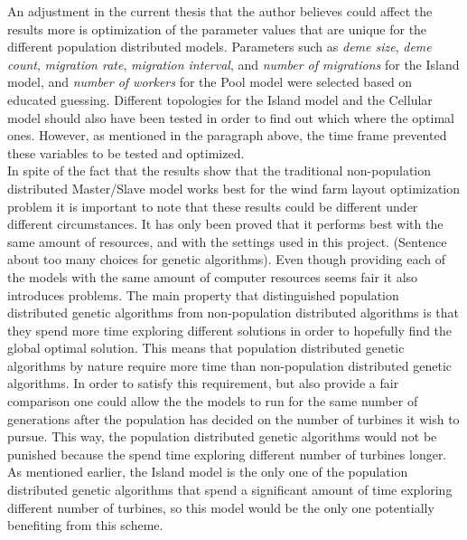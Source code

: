 \noindent An adjustment in the current thesis that the author believes could affect the results more is optimization of the parameter values that are unique for the different population distributed models. Parameters such as \textit{deme size}, \textit{deme count}, \textit{migration rate}, \textit{migration interval}, and \textit{number of migrations} for the Island model, and \textit{number of workers} for the Pool model were selected based on educated guessing. Different topologies for the Island model and the Cellular model should also have been tested in order to find out which where the optimal ones. However, as mentioned in the paragraph above, the time frame prevented these variables to be tested and optimized. \\

\noindent In spite of the fact that the results show that the traditional non-population distributed Master/Slave model works best for the wind farm layout optimization problem it is important to note that these results could be different under different circumstances. It has only been proved that it performs best with the same amount of resources, and with the settings used in this project. (Sentence about too many choices for genetic algorithms). Even though providing each of the models with the same amount of computer resources seems fair it also introduces problems. The main property that distinguished population distributed genetic algorithms from non-population distributed algorithms is that they spend more time exploring different solutions in order to hopefully find the global optimal solution. This means that population distributed genetic algorithms by nature require more time than non-population distributed genetic algorithms. In order to satisfy this requirement, but also provide a fair comparison one could allow the the models to run for the same number of generations after the population has decided on the number of turbines it wish to pursue. This way, the population distributed genetic algorithms would not be punished because the spend time exploring different number of turbines longer. As mentioned earlier, the Island model is the only one of the population distributed genetic algorithms that spend a significant amount of time exploring different number of turbines, so this model would be the only one potentially benefiting from this scheme.\\

